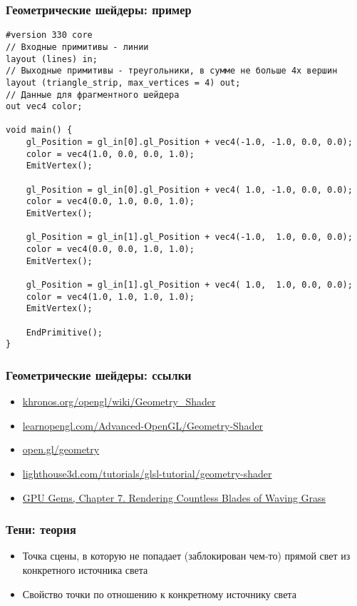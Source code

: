 \documentclass{beamer}
\begin{document}
\begin{frame}[fragile]
\frametitle{Геометрические шейдеры: пример}
\fontsize{8pt}{8pt}
\begin{verbatim}
#version 330 core
// Входные примитивы - линии
layout (lines) in;
// Выходные примитивы - треугольники, в сумме не больше 4х вершин
layout (triangle_strip, max_vertices = 4) out;
// Данные для фрагментного шейдера
out vec4 color;
  
void main() {
    gl_Position = gl_in[0].gl_Position + vec4(-1.0, -1.0, 0.0, 0.0);
    color = vec4(1.0, 0.0, 0.0, 1.0);
    EmitVertex();

    gl_Position = gl_in[0].gl_Position + vec4( 1.0, -1.0, 0.0, 0.0);
    color = vec4(0.0, 1.0, 0.0, 1.0);
    EmitVertex();

    gl_Position = gl_in[1].gl_Position + vec4(-1.0,  1.0, 0.0, 0.0);
    color = vec4(0.0, 0.0, 1.0, 1.0);
    EmitVertex();

    gl_Position = gl_in[1].gl_Position + vec4( 1.0,  1.0, 0.0, 0.0);
    color = vec4(1.0, 1.0, 1.0, 1.0);
    EmitVertex();

    EndPrimitive();
} 
\end{verbatim}
\end{frame}

\begin{frame}[fragile]
\frametitle{Геометрические шейдеры: ссылки}
\begin{itemize}
\item \href{https://www.khronos.org/opengl/wiki/Geometry_Shader}{khronos.org/opengl/wiki/Geometry\_Shader}
\item \href{https://learnopengl.com/Advanced-OpenGL/Geometry-Shader}{learnopengl.com/Advanced-OpenGL/Geometry-Shader}
\item \href{https://open.gl/geometry}{open.gl/geometry}
\item \href{https://www.lighthouse3d.com/tutorials/glsl-tutorial/geometry-shader}{lighthouse3d.com/tutorials/glsl-tutorial/geometry-shader}
\item \href{https://developer.download.nvidia.com/books/HTML/gpugems/gpugems_ch07.html}{GPU Gems, Chapter 7. Rendering Countless Blades of Waving Grass}
\end{itemize}
\end{frame}

\begin{frame}[fragile]
\frametitle{Тени: теория}
\begin{itemize}
\item Точка сцены, в которую не попадает (заблокирован чем-то) прямой свет из конкретного источника света
\item Свойство точки по отношению к конкретному источнику света
\end{itemize}
\end{frame}
\end{document}
